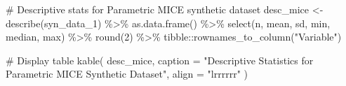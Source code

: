 \documentclass[
  letterpaper,
  DIV=11,
  numbers=noendperiod]{scrartcl}
\newenvironment{Shaded}{\begin{snugshade}}{\end{snugshade}}
\newcommand{\AttributeTok}[1]{\textcolor[rgb]{0.40,0.45,0.13}{#1}}
\newcommand{\CommentTok}[1]{\textcolor[rgb]{0.37,0.37,0.37}{#1}}
\newcommand{\DecValTok}[1]{\textcolor[rgb]{0.68,0.00,0.00}{#1}}
\newcommand{\FunctionTok}[1]{\textcolor[rgb]{0.28,0.35,0.67}{#1}}
\newcommand{\NormalTok}[1]{\textcolor[rgb]{0.00,0.23,0.31}{#1}}
\newcommand{\OtherTok}[1]{\textcolor[rgb]{0.00,0.23,0.31}{#1}}
\newcommand{\SpecialCharTok}[1]{\textcolor[rgb]{0.37,0.37,0.37}{#1}}
\newcommand{\StringTok}[1]{\textcolor[rgb]{0.13,0.47,0.30}{#1}}
\begin{document}
\begin{Shaded}
\begin{Highlighting}[]
\CommentTok{\# Descriptive stats for Parametric MICE synthetic dataset}
\NormalTok{desc\_mice }\OtherTok{\textless{}{-}} \FunctionTok{describe}\NormalTok{(syn\_data\_1) }\SpecialCharTok{\%\textgreater{}\%}
  \FunctionTok{as.data.frame}\NormalTok{() }\SpecialCharTok{\%\textgreater{}\%}
  \FunctionTok{select}\NormalTok{(n, mean, sd, min, median, max) }\SpecialCharTok{\%\textgreater{}\%}
  \FunctionTok{round}\NormalTok{(}\DecValTok{2}\NormalTok{) }\SpecialCharTok{\%\textgreater{}\%}
\NormalTok{  tibble}\SpecialCharTok{::}\FunctionTok{rownames\_to\_column}\NormalTok{(}\StringTok{"Variable"}\NormalTok{)}

\CommentTok{\# Display table}
\FunctionTok{kable}\NormalTok{(}
\NormalTok{  desc\_mice,}
  \AttributeTok{caption =} \StringTok{"Descriptive Statistics for Parametric MICE Synthetic Dataset"}\NormalTok{,}
  \AttributeTok{align =} \StringTok{"lrrrrrr"}
\NormalTok{)}
\end{Highlighting}
\end{Shaded}
\end{document}
